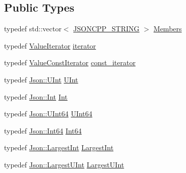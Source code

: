 \subsection*{Public Types}
\begin{DoxyCompactItemize}
\item 
typedef std\+::vector$<$ \hyperlink{json_8h_a1e723f95759de062585bc4a8fd3fa4be_a1e723f95759de062585bc4a8fd3fa4be}{J\+S\+O\+N\+C\+P\+P\+\_\+\+S\+T\+R\+I\+NG} $>$ \hyperlink{classJson_1_1Value_a9ae9069983fc38f1928d76f9c79ac64d_a9ae9069983fc38f1928d76f9c79ac64d}{Members}
\item 
typedef \hyperlink{classJson_1_1ValueIterator}{Value\+Iterator} \hyperlink{classJson_1_1Value_a341cdf2e01f8b3c5b7317aa2f0768c53_a341cdf2e01f8b3c5b7317aa2f0768c53}{iterator}
\item 
typedef \hyperlink{classJson_1_1ValueConstIterator}{Value\+Const\+Iterator} \hyperlink{classJson_1_1Value_af92282ca92b58b320debd486afb7696a_af92282ca92b58b320debd486afb7696a}{const\+\_\+iterator}
\item 
typedef \hyperlink{namespaceJson_a800fb90eb6ee8d5d62b600c06f87f7d4_a800fb90eb6ee8d5d62b600c06f87f7d4}{Json\+::\+U\+Int} \hyperlink{classJson_1_1Value_a0933d59b45793ae4aade1757c322a98d_a0933d59b45793ae4aade1757c322a98d}{U\+Int}
\item 
typedef \hyperlink{namespaceJson_a08122e8005b706d982e48cca1e2119c7_a08122e8005b706d982e48cca1e2119c7}{Json\+::\+Int} \hyperlink{classJson_1_1Value_abdf7a7ff73eb130ffcab28504ffdb405_abdf7a7ff73eb130ffcab28504ffdb405}{Int}
\item 
typedef \hyperlink{namespaceJson_adf3fa5cb60c619e4f02315ad355e0ca1_adf3fa5cb60c619e4f02315ad355e0ca1}{Json\+::\+U\+Int64} \hyperlink{classJson_1_1Value_a8b62564be8c087c6d18de180ff4e13e3_a8b62564be8c087c6d18de180ff4e13e3}{U\+Int64}
\item 
typedef \hyperlink{namespaceJson_ac62566f36fd33115957b91305c9ed1dc_ac62566f36fd33115957b91305c9ed1dc}{Json\+::\+Int64} \hyperlink{classJson_1_1Value_a1b86af9f85f0f1baa972c3319fa22695_a1b86af9f85f0f1baa972c3319fa22695}{Int64}
\item 
typedef \hyperlink{namespaceJson_a218d880af853ce786cd985e82571d297_a218d880af853ce786cd985e82571d297}{Json\+::\+Largest\+Int} \hyperlink{classJson_1_1Value_a1cbb82642ed05109b9833e49f042ece7_a1cbb82642ed05109b9833e49f042ece7}{Largest\+Int}
\item 
typedef \hyperlink{namespaceJson_ae202ecad69725e23443f465e257456d0_ae202ecad69725e23443f465e257456d0}{Json\+::\+Largest\+U\+Int} \hyperlink{classJson_1_1Value_a6682a3684d635e03fc06ba229fa24eec_a6682a3684d635e03fc06ba229fa24eec}{Largest\+U\+Int}

\end{DoxyCompactItemize}
